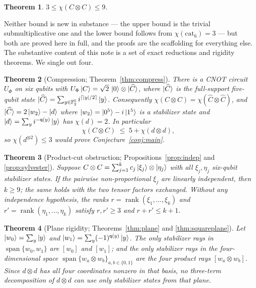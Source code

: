 \documentclass[11pt]{article}
\theoremstyle{plain}
\newtheorem{theorem}{Theorem}[section]
\theoremstyle{definition}
\newcommand{\F}{\mathbb{F}}
\newcommand{\cat}{\mathrm{cat}}
\newcommand{\qq}{\mathsf{q}}
\newcommand{\rank}{\operatorname{rank}}
\newcommand{\spn}{\operatorname{span}}
\newcommand{\wt}[1]{\lvert #1\rvert}
\begin{document}
\begin{theorem}\label{thm:main}
$3\le\chi(C\otimes C)\le9$.
\end{theorem}

\noindent Neither bound is new in substance --- the upper bound is the trivial
submultiplicative one and the lower bound follows from $\chi(\cat_6)=3$ --- but both are
proved here in full, and the proofs are the scaffolding for everything else. The
substantive content of this note is a set of exact reductions and rigidity theorems.
We single out four.

\begin{theorem}[Compression; Theorem~\ref{thm:compress}]\label{thm:introcompress}
There is a CNOT circuit $U_\Phi$ on six qubits with
$U_\Phi\ket{C}=\sqrt2\,\ket{0}\otimes\ket{\widehat C}$, where $\ket{\widehat C}$ is the
\emph{full-support} five-qubit state
$\ket{\widehat C}=\sum_{y\in\F_2^5}i^{\lceil \wt{y}/2\rceil}\ket{y}$. Consequently
$\chi(C\otimes C)=\chi(\widehat C\otimes\widehat C)$, and
$\ket{\widehat C}=2\ket{w_2}-\ket{d}$ where $\ket{w_2}=\ket{0^5}-i\ket{1^5}$ is a
stabilizer state and $\ket{d}=\sum_y i^{-\qq(y)}\ket y$ has $\chi(d)=2$. In particular
\[
\chi(C\otimes C)\;\le\;5+\chi(d\otimes d),
\]
so $\chi(d^{\otimes2})\le3$ would prove Conjecture~\ref{conj:main}.
\end{theorem}

\begin{theorem}[Product-cut obstruction; Propositions~\ref{prop:indep} and \ref{prop:sylvester}]
Suppose $C\otimes C=\sum_{j=1}^k c_j\ket{\xi_j}\otimes\ket{\eta_j}$ with all
$\xi_j,\eta_j$ six-qubit stabilizer states. If the pairwise non-proportional
$\xi_j$ are linearly independent, then $k\ge9$; the same holds with the two tensor
factors exchanged. Without any independence hypothesis, the ranks
$r=\rank(\xi_1,\dots,\xi_k)$ and $r'=\rank(\eta_1,\dots,\eta_k)$ satisfy
$r,r'\ge3$ and $r+r'\le k+1$.
\end{theorem}

\begin{theorem}[Plane rigidity; Theorems~\ref{thm:plane} and \ref{thm:squareplane}]
Let $\ket{w_0}=\sum_y\ket y$ and $\ket{w_1}=\sum_y(-1)^{\qq(y)}\ket y$. The only
stabilizer rays in $\spn\{w_0,w_1\}$ are $[w_0]$ and $[w_1]$; and the only stabilizer
rays in the four-dimensional space $\spn\{w_a\otimes w_b\}_{a,b\in\{0,1\}}$ are the four
product rays $[w_a\otimes w_b]$. Since $d\otimes d$ has all four coordinates nonzero in
that basis, no three-term decomposition of $d\otimes d$ can use only stabilizer states
from that plane.
\end{theorem}
\end{document}
